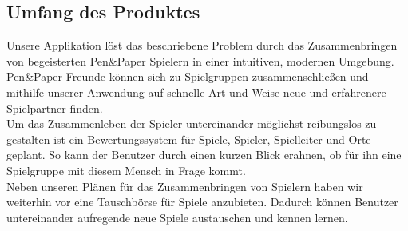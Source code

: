 \documentclass[DIV=13, 10pt,a4paper]{scrartcl}
\begin{document}
	\subsection*{Umfang des Produktes}
	Unsere Applikation löst das beschriebene Problem durch das Zusammenbringen von begeisterten Pen\&Paper Spielern in einer intuitiven, modernen Umgebung. Pen\&Paper Freunde können sich zu Spielgruppen zusammenschließen und mithilfe unserer Anwendung auf schnelle Art und Weise neue und erfahrenere Spielpartner finden.\\
	Um das Zusammenleben der Spieler untereinander möglichst reibungslos zu gestalten ist ein Bewertungssystem für Spiele, Spieler, Spielleiter und Orte geplant. So kann der Benutzer durch einen kurzen Blick erahnen, ob für ihn eine Spielgruppe mit diesem Mensch in Frage kommt.\\
	Neben unseren Plänen für das Zusammenbringen von Spielern haben wir weiterhin vor eine Tauschbörse für Spiele anzubieten. Dadurch können Benutzer untereinander aufregende neue Spiele austauschen und kennen lernen.
\end{document}
